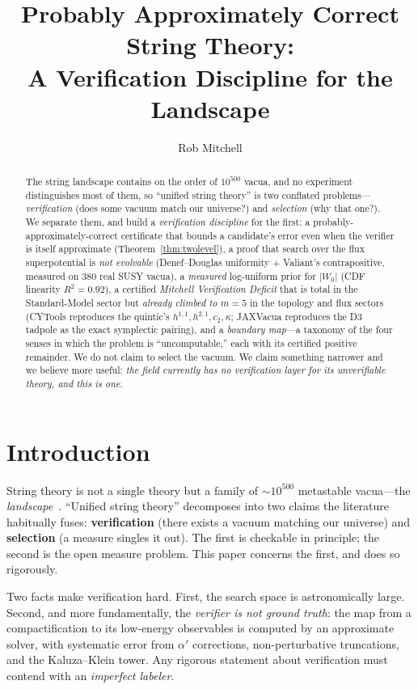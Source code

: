 \documentclass[11pt]{article}
\title{Probably Approximately Correct String Theory:\\ A Verification Discipline for the Landscape}
\author{Rob Mitchell}
\date{}
\begin{document}
\maketitle

\begin{abstract}
The string landscape contains on the order of $10^{500}$ vacua, and no experiment
distinguishes most of them, so ``unified string theory'' is two conflated
problems---\emph{verification} (does some vacuum match our universe?) and
\emph{selection} (why that one?). We separate them, and build a \emph{verification
discipline} for the first: a probably-approximately-correct certificate that bounds a
candidate's error even when the verifier is itself approximate (Theorem~\ref{thm:twolevel}),
a proof that search over the flux superpotential is \emph{not evolvable} (Denef--Douglas
uniformity + Valiant's contrapositive, measured on $380$ real SUSY vacua), a
\emph{measured} log-uniform prior for $|W_0|$ (CDF linearity $R^2 = 0.92$), a certified
\emph{Mitchell Verification Deficit} that is total in the Standard-Model sector but
\emph{already climbed to $m=5$} in the topology and flux sectors (CYTools reproduces the
quintic's $h^{1,1},h^{2,1},c_2,\kappa$; JAXVacua reproduces the D3 tadpole as the exact
symplectic pairing), and a
\emph{boundary map}---a taxonomy of the four senses in which the problem is
``uncomputable,'' each with its certified positive remainder. We do not claim to select
the vacuum. We claim something narrower and we believe more useful: \emph{the field
currently has no verification layer for its unverifiable theory, and this is one.}
\end{abstract}

\section{Introduction}
\label{sec:intro}

String theory is not a single theory but a family of $\sim 10^{500}$ metastable
vacua---the \emph{landscape}~\cite{bousso,douglas,susskind}. ``Unified string theory''
decomposes into two claims the literature habitually fuses: \textbf{verification}
(there exists a vacuum matching our universe) and \textbf{selection} (a measure singles
it out). The first is checkable in principle; the second is the open measure problem.
This paper concerns the first, and does so rigorously.

Two facts make verification hard. First, the search space is astronomically large.
Second, and more fundamentally, the \emph{verifier is not ground truth}: the map from a
compactification to its low-energy observables is computed by an approximate solver,
with systematic error from $\alpha'$ corrections, non-perturbative truncations, and the
Kaluza--Klein tower. Any rigorous statement about verification must contend with an
\emph{imperfect labeler}.
\end{document}
